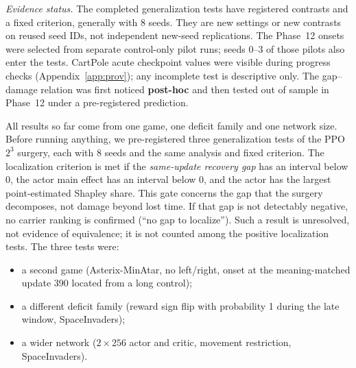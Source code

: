 \documentclass[10pt]{article} %
\begin{document}
\noindent\textit{Evidence status.} The completed generalization tests have registered contrasts and a fixed criterion, generally with 8 seeds. They are new settings or new contrasts on reused seed IDs, not independent new-seed replications. The Phase~12 onsets were selected from separate control-only pilot runs; seeds 0--3 of those pilots also enter the tests. CartPole acute checkpoint values were visible during progress checks (Appendix~\ref{app:prov}); any incomplete test is descriptive only. The gap--damage relation was first noticed \textbf{post-hoc} and then tested out of sample in Phase~12 under a pre-registered prediction.

All results so far come from one game, one deficit family and one network size. Before running anything, we pre-registered three generalization tests of the PPO $2^3$ surgery, each with 8 seeds and the same analysis and fixed criterion. The localization criterion is met if the \emph{same-update recovery gap} has an interval below 0, the actor main effect has an interval below 0, and the actor has the largest point-estimated Shapley share. This gate concerns the gap that the surgery decomposes, not damage beyond lost time. If that gap is not detectably negative, no carrier ranking is confirmed (``no gap to localize''). Such a result is unresolved, not evidence of equivalence; it is not counted among the positive localization tests. The three tests were:
\begin{itemize}
\item a second game (Asterix-MinAtar, no left/right, onset at the meaning-matched update 390 located from a long control);
\item a different deficit family (reward sign flip with probability 1 during the late window, SpaceInvaders);
\item a wider network ($2\times256$ actor and critic, movement restriction, SpaceInvaders).
\end{itemize}
\end{document}
